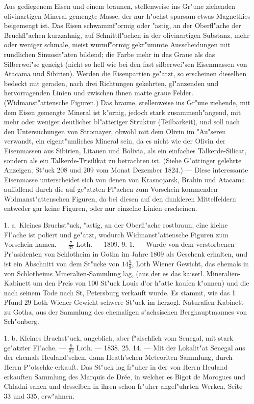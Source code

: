 \documentclass[a4paper, 11pt, oneside, polutonikogreek, german]{article}
\begin{document}
Aus gediegenem Eisen und einem braunen, stellenweise ins Gr"une ziehenden olivinartigen Mineral gemengte Masse, der nur h"ochst sparsam etwas Magnetkies beigemengt ist. Das Eisen schwammf"ormig oder "astig, an der Oberfl"ache der Bruchfl"achen kurzzahnig, auf Schnittfl"achen in der olivinartigen Substanz, mehr oder weniger schmale, meist wurmf"ormig gekr"ummte Ausscheidungen mit rundlichen Sinuosit"aten bildend; die Farbe mehr in das Graue als das Silberwei"se geneigt (nicht so hell wie bei den fast silberwei"sen Eisenmassen von Atacama und Sibirien). Werden die Eisenpartien ge"atzt, so erscheinen dieselben bedeckt mit geraden, nach drei Richtungen gekehrten, gl"anzenden und hervorragenden Linien und zwischen ihnen matte graue Felder. (Widmanst"attensche Figuren.) Das braune, stellenweise ins Gr"une ziehende, mit dem Eisen gemengte Mineral ist k"ornig, jedoch stark zusammenh"angend, mit mehr oder weniger deutlicher bl"atteriger Struktur (Teilbarkeit), und soll nach den Untersuchungen von Stromayer, obwohl mit dem Olivin im "Au"seren verwandt, ein eigent"umliches Mineral sein, da es nicht wie der Olivin der Eisenmassen aus Sibirien, Litauen und Bolivia, als ein einfaches Talkerde-Silicat, sondern als ein Talkerde-Trisilikat zu betrachten ist. (Siehe G"ottinger gelehrte Anzeigen, St"uck 208 und 209 vom Monat Dezember 1824.) --- Diese interessante Eisenmasse unterscheidet sich von denen von Krasnojarsk, Brahin und Atacama auffallend durch die auf ge"atzten Fl"achen zum Vorschein kommenden Widmanst"attenschen Figuren, da bei diesen auf den dunkleren Mittelfeldern entweder gar keine Figuren, oder nur einzelne Linien erscheinen.

1. a. Kleines Bruchst"uck, "astig, an der Oberfl"ache rostbraun; eine kleine Fl"ache ist poliert und ge"atzt, wodurch Widmanst"attensche Figuren zum Vorschein kamen. --- $\mathfrak{\frac{7}{32}}$ Loth. --- 1809. 9. 1. --- Wurde von dem verstorbenen Pr"asidenten von Schlotheim in Gotha im Jahre 1809 als Geschenk erhalten, und ist ein Abschnitt von dem St"ucke von $\mathfrak{14\frac{5}{8}}$, Loth Wiener Gewicht, das ehemals in von Schlotheims Mineralien-Sammlung lag, (aus der es das kaiserl. Mineralien-Kabinett um den Preis von 100 St"uck Louis d'or h"atte kaufen k"onnen) und die nach seinem Tode nach St, Petersburg verkauft wurde. Es stammt, wie das 1 Pfund 29 Loth Wiener Gewicht schwere St"uck im herzogl. Naturalien-Kabinett zu Gotha, aus der Sammlung des ehemaligen s"achsischen Berghauptmannes von Sch"onberg.

1. b. Kleines Bruchst"uck, angeblich, aber f"alschlich vom Senegal, mit stark ge"atzter Fl"ache. --- $\mathfrak{\frac{9}{32}}$ Loth. --- 1838. 25. 14. --- Mit der Lokalit"at Senegal aus der ehemals Heuland'schen, dann Heath'schen Meteoriten-Sammlung, durch Herrn P"otschke erkauft. Das St"uck lag fr"uher in der von Herrn Heuland erkauften Sammlung des Marquis de Drée, in welcher es Bigot de Morogues und Chladni sahen und desselben in ihren schon fr"uher angef"uhrten Werken, Seite 33 und 335, erw"ahnen.
\end{document}
